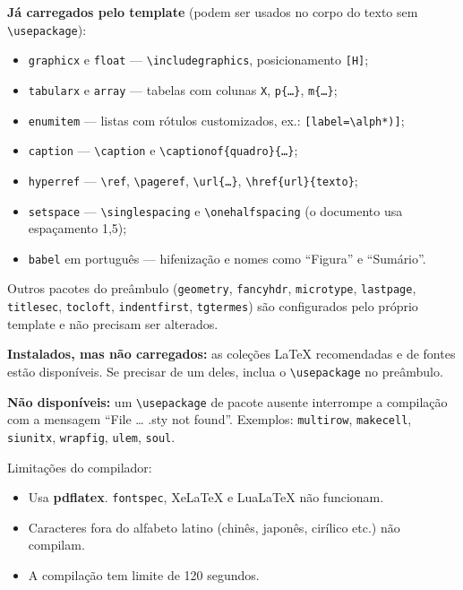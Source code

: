 \documentclass[
  brazilian,
  a4paper,12pt,oneside]{report}
\providecommand{\tightlist}{%
  \setlength{\itemsep}{0pt}\setlength{\parskip}{0pt}}
\begin{document}
\textbf{Já carregados pelo template} (podem ser usados no corpo do texto
sem \texttt{\textbackslash{}usepackage}):

\begin{itemize}
\tightlist
\item
  \texttt{graphicx} e \texttt{float} ---
  \texttt{\textbackslash{}includegraphics}, posicionamento
  \texttt{{[}H{]}};
\item
  \texttt{tabularx} e \texttt{array} --- tabelas com colunas \texttt{X},
  \texttt{p\{…\}}, \texttt{m\{…\}};
\item
  \texttt{enumitem} --- listas com rótulos customizados, ex.:
  \texttt{{[}label=}\allowbreak{}\texttt{\textbackslash{}alph*){]}};
\item
  \texttt{caption} --- \texttt{\textbackslash{}caption} e
  \texttt{\textbackslash{}captionof\{quadro\}\{…\}};
\item
  \texttt{hyperref} --- \texttt{\textbackslash{}ref},
  \texttt{\textbackslash{}pageref}, \texttt{\textbackslash{}url\{…\}},
  \texttt{\textbackslash{}href\{url\}\{texto\}};
\item
  \texttt{setspace} --- \texttt{\textbackslash{}singlespacing} e
  \texttt{\textbackslash{}onehalfspacing} (o documento usa espaçamento
  1,5);
\item
  \texttt{babel} em português --- hifenização e nomes como ``Figura'' e
  ``Sumário''.
\end{itemize}

Outros pacotes do preâmbulo (\texttt{geometry}, \texttt{fancyhdr},
\texttt{microtype}, \texttt{lastpage}, \texttt{titlesec},
\texttt{tocloft}, \texttt{indentfirst}, \texttt{tgtermes}) são
configurados pelo próprio template e não precisam ser alterados.

\textbf{Instalados, mas não carregados:} as coleções LaTeX recomendadas
e de fontes estão disponíveis. Se precisar de um deles, inclua o
\texttt{\textbackslash{}usepackage} no preâmbulo.

\textbf{Não disponíveis:} um \texttt{\textbackslash{}usepackage} de
pacote ausente interrompe a compilação com a mensagem ``File \ldots{}
.sty not found''. Exemplos: \texttt{multirow}, \texttt{makecell},
\texttt{siunitx}, \texttt{wrapfig}, \texttt{ulem}, \texttt{soul}.

Limitações do compilador:

\begin{itemize}
\tightlist
\item
  Usa \textbf{pdflatex}. \texttt{fontspec}, XeLaTeX e LuaLaTeX não
  funcionam.
\item
  Caracteres fora do alfabeto latino (chinês, japonês, cirílico etc.)
  não compilam.
\item
  A compilação tem limite de 120 segundos.
\end{itemize}
\end{document}
